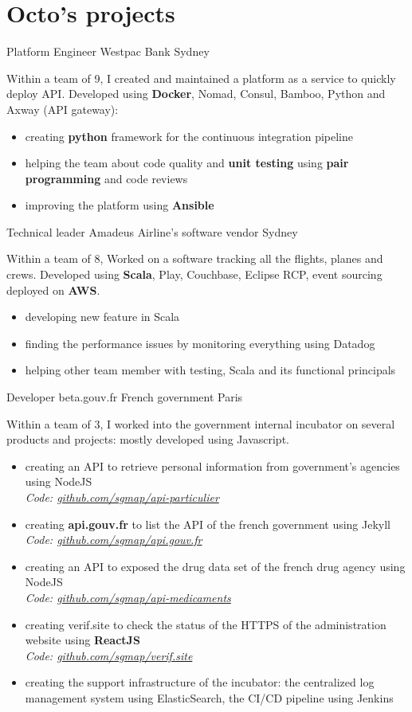 \documentclass[11pt,a4paper]{moderncv}
\begin{document}
\clearpage
\section{Octo's projects}

{Platform Engineer}
{Westpac}
{Bank}
{Sydney}
{
Within a team of 9, I created and maintained a platform as a service to quickly deploy API. Developed using \textbf{Docker}, Nomad, Consul, Bamboo, Python and Axway (API gateway):
\begin{itemize}
\item creating \textbf{python} framework for the continuous integration pipeline
\item helping the team about code quality and \textbf{unit testing} using \textbf{pair programming} and code reviews
\item improving the platform using \textbf{Ansible}
\end{itemize}
\vspace{5mm}
}

{Technical leader}
{Amadeus}
{Airline's software vendor}
{Sydney}
{
Within a team of 8, Worked on a software tracking all the flights, planes and crews. Developed using \textbf{Scala}, Play, Couchbase, Eclipse RCP, event sourcing deployed on \textbf{AWS}.
\begin{itemize}
\item developing new feature in Scala
\item finding the performance issues by monitoring everything using Datadog
\item helping other team member with testing, Scala and its functional principals
\end{itemize}
\vspace{5mm}
}

{Developer}
{beta.gouv.fr}
{French government}
{Paris}
{
Within a team of 3, I worked into the government internal incubator on several products and projects: mostly developed using Javascript.
\begin{itemize}
\item creating an API to retrieve personal information from  government's agencies using NodeJS
\\
\textit{Code: \url{github.com/sgmap/api-particulier}}
\item creating \textbf{api.gouv.fr} to list the API of the french government using Jekyll
\\
\textit{Code: \url{github.com/sgmap/api.gouv.fr}}
\item creating an API to exposed the drug data set of the french drug agency using NodeJS
\\
\textit{Code: \url{github.com/sgmap/api-medicaments}}
\item creating verif.site to check the status of the HTTPS of the administration website using \textbf{ReactJS}
\\
\textit{Code: \url{github.com/sgmap/verif.site}}
\item creating the support infrastructure of the incubator: the centralized log management system using ElasticSearch, the CI/CD pipeline using Jenkins
\end{itemize}
\vspace{5mm}
}
\end{document}

